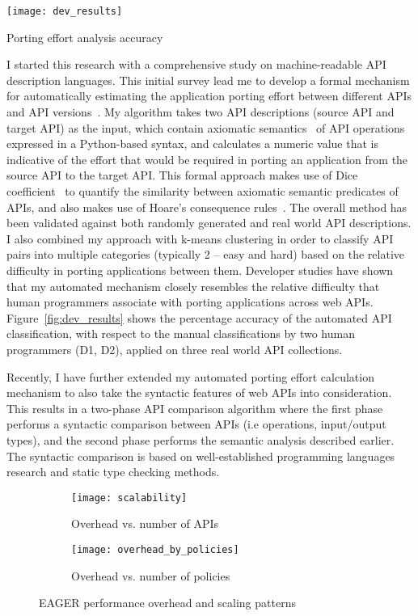 \begin{floatingfigure}{2.8in}
\vspace{-0.1in}
\texttt{[image: dev\_results]}
\vspace{-0.08in}
\caption{Porting effort analysis accuracy\label{fig:dev_results}}
\end{floatingfigure}

I started this research with a comprehensive study on machine-readable 
API description languages. This initial survey lead me to develop a formal 
mechanism for automatically estimating the application porting effort between 
different APIs and API versions~\cite{6930607}. My algorithm takes two API descriptions 
(source API and target API) as the input, which contain axiomatic semantics~\cite{Hoare:1969:ABC:363235.363259} of 
API operations expressed in a Python-based syntax, and calculates a numeric 
value that is indicative of the effort that would be required in porting an application 
from the source API to the target API. This formal approach makes use of Dice 
coefficient~\cite{dice1945,738528} to quantify the similarity between axiomatic semantic predicates of APIs, 
and also makes use of Hoare's consequence rules~\cite{Hoare:1969:ABC:363235.363259}. The overall method has been 
validated against both randomly generated and real world API descriptions. 
I also combined my approach with k-means clustering in order to classify API pairs into 
multiple categories (typically 2 -- easy and hard) based on the relative difficulty in 
porting applications between them. Developer studies have shown that my 
automated mechanism closely resembles the relative difficulty 
that human programmers associate with porting applications across web APIs.
Figure~\ref{fig:dev_results} shows the percentage accuracy of the automated API
classification, with respect to the manual classifications by two human programmers
(D1, D2), applied on three real world API collections.

Recently, I have further extended my automated porting effort calculation 
mechanism to also take the syntactic features of web APIs into consideration. This 
results in a two-phase API comparison algorithm where the first phase performs a 
syntactic comparison between APIs (i.e operations, input/output types), and the 
second phase performs the semantic analysis described earlier. The syntactic 
comparison is based on well-established programming languages research and 
static type checking methods.

\begin{figure}
\centering
\begin{subfigure}{.5\textwidth}
  \centering
  \texttt{[image: scalability]}
  \caption{Overhead vs. number of APIs}
  \label{fig:sub1}
\end{subfigure}%
\begin{subfigure}{.5\textwidth}
  \centering
  \texttt{[image: overhead\_by\_policies]}
  \caption{Overhead vs. number of policies}
  \label{fig:sub2}
\end{subfigure}
\caption{EAGER performance overhead and scaling patterns}
\label{fig:eager_perf}
\end{figure}

